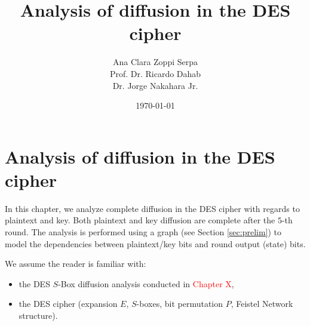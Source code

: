 \documentclass{report}
\title{Analysis of diffusion in the DES cipher}
\author{Ana Clara Zoppi Serpa\\ Prof. Dr. Ricardo Dahab \\ Dr. Jorge Nakahara Jr.}
\date{\today}
\begin{document}
\maketitle

\tableofcontents

\chapter{Analysis of diffusion in the DES cipher}


In this chapter, we analyze complete diffusion in the DES cipher \cite{DES-FIPS} with regards to plaintext and key. Both plaintext and key diffusion are complete after the $5$-th round. The analysis is performed using a graph (see Section \ref{sec:prelim}) to model the dependencies between plaintext/key bits and round output (state) bits.

We assume the reader is familiar with:
\begin{itemize}
    \item the DES $S$-Box diffusion analysis conducted in \textcolor{red}{Chapter X},
    \item the DES cipher (expansion $E$, $S$-boxes, bit permutation $P$, Feistel Network structure).
\end{itemize}
\end{document}
